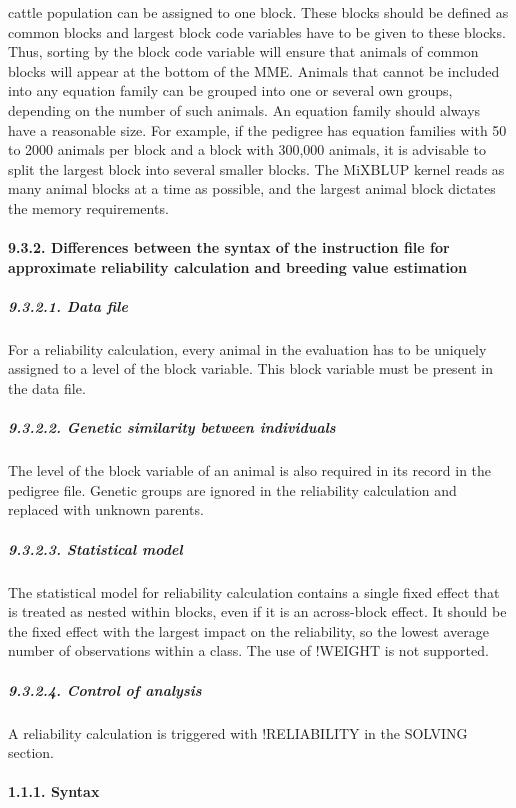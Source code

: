 cattle population can be assigned to one block. These blocks should be
defined as common blocks and largest block code variables have to be
given to these blocks. Thus, sorting by the block code variable will
ensure that animals of common blocks will appear at the bottom of the
MME. Animals that cannot be included into any equation family can be
grouped into one or several own groups, depending on the number of such
animals. An equation family should always have a reasonable size. For
example, if the pedigree has equation families with 50 to 2000 animals
per block and a block with 300,000 animals, it is advisable to split the
largest block into several smaller blocks. The MiXBLUP kernel reads as
many animal blocks at a time as possible, and the largest animal block
dictates the memory requirements.

\paragraph{9.3.2. Differences between the syntax of the instruction file
for approximate reliability calculation and breeding value
estimation}\label{Reli14}

\subparagraph{9.3.2.1. Data file}\label{Reli15}

For a reliability calculation, every animal in the evaluation has to be
uniquely assigned to a level of the block variable. This block variable
must be present in the data file.

\subparagraph{9.3.2.2. Genetic similarity between
individuals}\label{Reli16}

The level of the block variable of an animal is also required in its
record in the pedigree file. Genetic groups are ignored in the
reliability calculation and replaced with unknown parents.

\subparagraph{9.3.2.3. Statistical model}\label{Reli17}

The statistical model for reliability calculation contains a single
fixed effect that is treated as nested within blocks, even if it is an
across-block effect. It should be the fixed effect with the largest
impact on the reliability, so the lowest average number of observations
within a class. The use of !WEIGHT is not supported.

\subparagraph{9.3.2.4. Control of analysis}\label{Reli18}

A reliability calculation is triggered with !RELIABILITY in the SOLVING
section.

\paragraph{1.1.1. Syntax}\label{Reli19}

